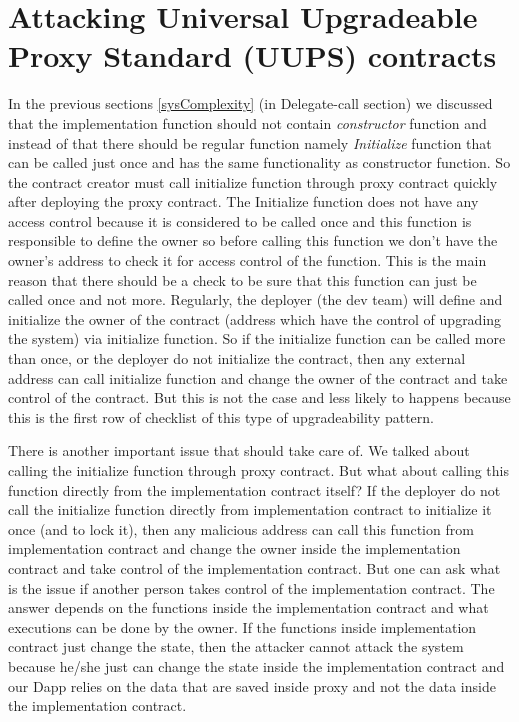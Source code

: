 \section{Attacking Universal Upgradeable Proxy Standard (UUPS) contracts} \label{sec:attackUUPS}
In the previous sections \ref{sysComplexity} (in Delegate-call section) we discussed that the implementation function should not contain \textit{constructor} function and instead of that there should be regular function namely \textit{Initialize} function that can be called just once and has the same functionality as constructor function. So the contract creator must call initialize function through proxy contract quickly after deploying the proxy contract. The Initialize function does not have any access control because it is considered to be called once and this function is responsible to define the owner so before calling this function we don't have the owner's address to check it for access control of the function. This is the main reason that there should be a check to be sure that this function can just be called once and not more. Regularly, the deployer (the dev team) will define and initialize the owner of the contract (address which have the control of upgrading the system) via initialize function. So if the initialize function can be called more than once, or the deployer do not initialize the contract, then any external address can call initialize function and change the owner of the contract and take control of the contract. But this is not the case and less likely to happens because this is the first row of checklist of this type of upgradeability pattern.

There is another important issue that should take care of. We talked about calling the initialize function through proxy contract. But what about calling this function directly from the implementation contract itself? If the deployer do not call the initialize function directly from implementation contract to initialize it once (and to lock it), then any malicious address can call this function from implementation contract and change the owner inside the implementation contract and take control of the implementation contract. But one can ask what is the issue if another person takes control of the implementation contract. The answer depends on the functions inside the implementation contract and what executions can be done by the owner. If the functions inside implementation contract just change the state, then the attacker cannot attack the system because he/she just can change the state inside the implementation contract and our Dapp relies on the data that are saved inside proxy and not the data inside the implementation contract.

